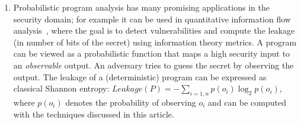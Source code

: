 \begin{enumerate}
\item Probabilistic program analysis has many promising applications in the security domain; for example it can be used in quantitative information flow analysis~\cite{FSE16}, where the goal is to detect vulnerabilities and compute the leakage (in number of bits of the secret) using information theory metrics. A program can be viewed as a probabilistic function that maps a high security input to an {\em observable} output. An adversary tries to guess the secret by observing the output.  The leakage of a (deterministic) program can be expressed as classical Shannon entropy: $Leakage(P)=-\sum_{i=1,n} p(o_i) \log_2 p(o_i)$, where $p(o_i)$ denotes the probability of observing $o_i$ and can be computed with the techniques discussed in this article.
\end{enumerate}
